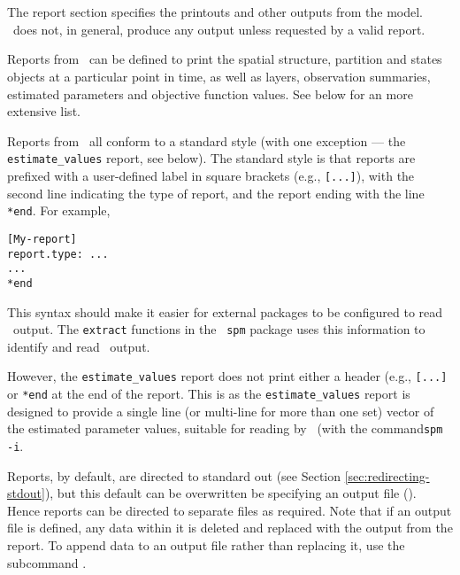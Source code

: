 \section{\label{sec:report-section}}

The report section specifies the printouts and other outputs from the model. \SPM\ does not, in general, produce any output unless requested by a valid report. 

Reports from \SPM\ can be defined to print the spatial structure, partition and states objects at a particular point in time, as well as layers, observation summaries, estimated parameters and objective function values. See below for an more extensive list.

Reports from \SPM\ all conform to a standard style (with one exception --- the \texttt{estimate\_values} report, see below). The standard style is that reports are prefixed with a user-defined label in square brackets (e.g., \texttt{[...]}), with the second line indicating the type of report, and the report ending with the line \texttt{*end}. For example,

\begin{verbatim} 
[My-report]
report.type: ...
...
*end
\end{verbatim}

This syntax should make it easier for external packages to be configured to read \SPM\ output. The \texttt{extract} functions in the \R\ \texttt{spm} package uses this information to identify and read \SPM\ output.

However, the \texttt{estimate\_values} report does not print either a header (e.g., \texttt{[...]} or \texttt{*end} at the end of the report. This is as the \texttt{estimate\_values} report is designed to provide a single line (or multi-line for more than one set) vector of the estimated parameter values, suitable for reading by \SPM\ (with the command\texttt{spm -i}. 

Reports, by default, are directed to standard out (see Section \ref{sec:redirecting-stdout}), but this default can be overwritten be specifying an output file (). Hence reports can be directed to separate files as required. Note that if an output file is defined, any data within it is deleted and replaced with the output from the report. To append data to an output file rather than replacing it, use the subcommand .

